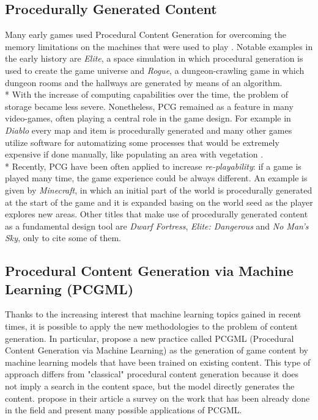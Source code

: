 \subsection{Procedurally Generated Content}
Many early games used Procedural Content Generation for overcoming the memory limitations on the machines that were used to play \cite{pcgbook}. Notable examples in the early history are \textit{Elite}\cite{game:elite}, a space simulation in which procedural generation is used to create the game universe and \textit{Rogue}\cite{game:rogue}, a dungeon-crawling game in which dungeon rooms and the hallways are generated by means of an algorithm. \\*
With the increase of computing capabilities over the time, the problem of storage became less severe. Nonetheless, PCG remained as a feature in many video-games, often playing a central role in the game design. For example in \textit{Diablo}\cite{game:diablo} every map and item is procedurally generated and many other games utilize software for automatizing some processes that would be extremely expensive if done manually, like populating an area with vegetation \cite{pcgpaper}.\\*
Recently, PCG have been often applied to increase \textit{re-playability}: if a game is played many time, the game experience could be always different. An example is given by \textit{Minecraft}\cite{game:minecraft}, in which an initial part of the world is procedurally generated at the start of the game and it is expanded basing on the world seed as the player explores new areas. Other titles that make use of procedurally generated content as a fundamental design tool are \textit{Dwarf Fortress}\cite{game:dwarf}, \textit{Elite: Dangerous}\cite{game:elitedangerous} and \textit{No Man's Sky}\cite{game:nomanssky}, only to cite some of them.


\subsection{Procedural Content Generation via Machine Learning (PCGML)}
Thanks to the increasing interest that machine learning topics gained in recent times, it is possible to apply the new methodologies to the problem of content generation. In particular, \citeauthor{PCGML} propose a new practice called PCGML (Procedural Content Generation via Machine Learning) \cite{PCGML} as the generation of game content by machine learning models that have been trained on existing content. This type of approach differs from "classical" procedural content generation because it does not imply a search in the content space, but the model directly generates the content.  \citeauthor{PCGML} propose in their article a survey on the work that has been already done in the field and present many possible applications of PCGML.


